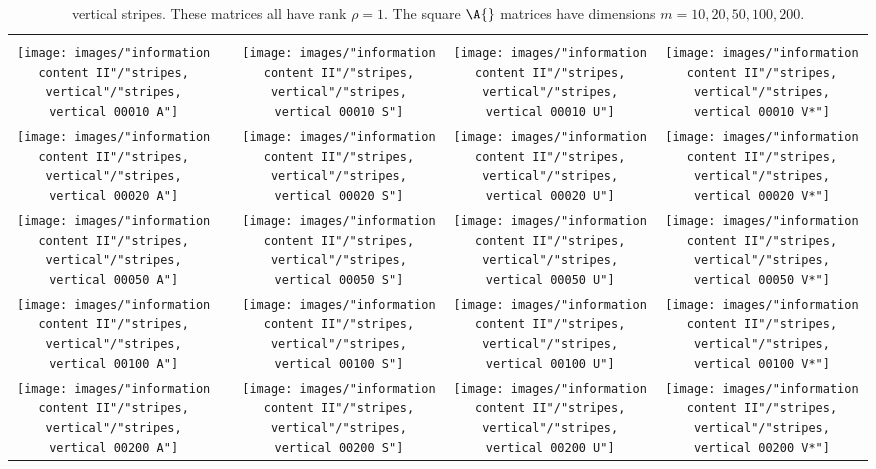 \begin{table}[htdp]
\caption[vertical stripes]{vertical stripes. These matrices all have rank $\rho = 1$. The square $\A{}$ matrices have dimensions $m=10,20,50,100,200$.}
\begin{center}
\begin{tabular}{ccccc}
%
 \svdi{} \\
%
 \texttt{[image: images/"information content II"/"stripes, vertical"/"stripes, vertical 00010 A"]} &&
 \texttt{[image: images/"information content II"/"stripes, vertical"/"stripes, vertical 00010 S"]} &
 \texttt{[image: images/"information content II"/"stripes, vertical"/"stripes, vertical 00010 U"]} &
 \texttt{[image: images/"information content II"/"stripes, vertical"/"stripes, vertical 00010 V*"]} \\
%
 \texttt{[image: images/"information content II"/"stripes, vertical"/"stripes, vertical 00020 A"]} &&
 \texttt{[image: images/"information content II"/"stripes, vertical"/"stripes, vertical 00020 S"]} &
 \texttt{[image: images/"information content II"/"stripes, vertical"/"stripes, vertical 00020 U"]} &
 \texttt{[image: images/"information content II"/"stripes, vertical"/"stripes, vertical 00020 V*"]} \\
%
 \texttt{[image: images/"information content II"/"stripes, vertical"/"stripes, vertical 00050 A"]} &&
 \texttt{[image: images/"information content II"/"stripes, vertical"/"stripes, vertical 00050 S"]} &
 \texttt{[image: images/"information content II"/"stripes, vertical"/"stripes, vertical 00050 U"]} &
 \texttt{[image: images/"information content II"/"stripes, vertical"/"stripes, vertical 00050 V*"]} \\
%
 \texttt{[image: images/"information content II"/"stripes, vertical"/"stripes, vertical 00100 A"]} &&
 \texttt{[image: images/"information content II"/"stripes, vertical"/"stripes, vertical 00100 S"]} &
 \texttt{[image: images/"information content II"/"stripes, vertical"/"stripes, vertical 00100 U"]} &
 \texttt{[image: images/"information content II"/"stripes, vertical"/"stripes, vertical 00100 V*"]} \\
%
 \texttt{[image: images/"information content II"/"stripes, vertical"/"stripes, vertical 00200 A"]} &&
 \texttt{[image: images/"information content II"/"stripes, vertical"/"stripes, vertical 00200 S"]} &
 \texttt{[image: images/"information content II"/"stripes, vertical"/"stripes, vertical 00200 U"]} &
 \texttt{[image: images/"information content II"/"stripes, vertical"/"stripes, vertical 00200 V*"]} 
\end{tabular}
\end{center}
\label{tab:info content II:vertical stripes}
\end{table}%


\endinput